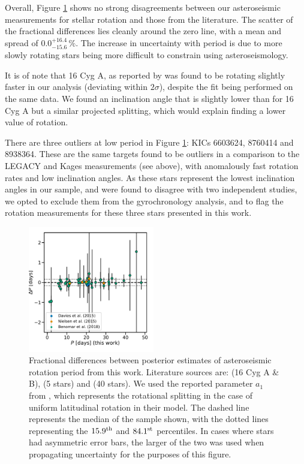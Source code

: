 \documentclass[12pt]{article}
\begin{document}
Overall, Figure \ref{fig:literaturecomp} shows no strong disagreements between our asteroseismic measurements for stellar rotation and those from the literature. The scatter of the fractional differences lies cleanly around the zero line, with a mean and spread of $0.0_{-15.6}^{+16.4}\, \%$. The increase in uncertainty with period is due to more slowly rotating stars being more difficult to constrain using asteroseismology.

It is of note that 16 Cyg A, as reported by \cite{davies+2015} was found to be rotating slightly faster in our analysis (deviating within $2\sigma$), despite the fit being performed on the same data. We found an inclination angle that is slightly lower than \cite{davies+2015} for 16 Cyg A but a similar projected splitting, which would explain finding a lower value of rotation.

There are three outliers at low period in Figure \ref{fig:literaturecomp}: KICs 6603624, 8760414 and 8938364. These are the same targets found to be outliers in a comparison to the LEGACY and Kages measurements (see above), with anomalously fast rotation rates and low inclination angles. As these stars represent the lowest inclination angles in our sample, and were found to disagree with two independent studies, we opted to exclude them from the gyrochronology analysis, and to flag the rotation measurements for these three stars presented in this work.

\begin{figure}
	\centering
	\includegraphics[width=0.49\textwidth]{Images/seis_comparison_rot_alt2.pdf}
	\caption{Fractional differences between posterior estimates of asteroseismic rotation period from this work. Literature sources are: \cite{davies+2015} (16 Cyg A \& B), \cite{nielsen+2015} (5 stars) and \cite{benomar+2018} (40 stars). We used the reported parameter $a_{1}$ from \cite{benomar+2018}, which represents the rotational splitting in the case of uniform latitudinal rotation in their model. The dashed line represents the median of the sample shown, with the dotted lines representing the $15.9^{\rm{th}}$ and $84.1^{\rm{st}}$ percentiles. In cases where stars had asymmetric error bars, the larger of the two was used when propagating uncertainty for the purposes of this figure.}
	\label{fig:literaturecomp}
\end{figure}
\end{document}
